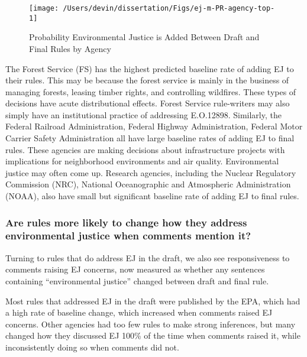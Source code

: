 \documentclass[
      12pt,
        ]{article}
\begin{document}
\begin{figure}

{\centering \texttt{[image: /Users/devin/dissertation/Figs/ej-m-PR-agency-top-1]} 

}

\caption{Probability Environmental Justice is Added Between Draft and Final Rules by Agency}\label{fig:ej-m-PR-agency-top}
\end{figure}

The Forest Service (FS) has the highest predicted baseline rate of adding EJ to their rules. This may be because the forest service is mainly in
the business of managing forests, leasing timber rights, and controlling
wildfires. These types of decisions have acute distributional
effects. Forest Service rule-writers may also simply have an institutional practice of addressing E.O.12898.
Similarly, the Federal
Railroad Administration, Federal Highway
Administration, Federal Motor Carrier Safety Administration all have large baseline rates of adding EJ to final rules. These agencies are
making decisions about infrastructure projects with implications for
neighborhood environments and air quality. Environmental justice may
often come up.
Research agencies, including the Nuclear Regulatory Commission (NRC), National Oceanographic and Atmospheric Administration (NOAA), also have small but significant baseline rate of adding EJ to final rules.

\hypertarget{are-rules-more-likely-to-change-how-they-address-environmental-justice-when-comments-mention-it}{%
\subsubsection{Are rules more likely to change how they address environmental justice when comments mention it?}\label{are-rules-more-likely-to-change-how-they-address-environmental-justice-when-comments-mention-it}}

Turning to rules that do address EJ in the draft, we also see responsiveness to comments raising EJ concerns, now measured as whether any sentences containing ``environmental justice'' changed between draft and final rule.

Most rules that addressed EJ in the draft were published by the EPA, which had a high rate of baseline change, which increased when comments raised EJ concerns. Other agencies had too few rules to make strong inferences, but many changed how they discussed EJ 100\% of the time when comments raised it, while inconsistently doing so when comments did not.
\end{document}
